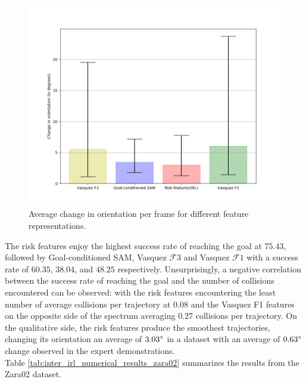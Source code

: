 \begin{figure}[htbp]
	\includegraphics[width=.95\linewidth]{plots/zara02_inter_irl_adjusted_speed/compute_trajectory_smoothness_zara02_adjusted_inter_irl.png}
	\caption{Average change in orientation per frame for different feature representations.}
	\label{fig:inter_irl-trajectory_smoothness-zara02}
\end{figure}

 The risk features enjoy the highest success rate of reaching the goal at $75.43$, followed by Goal-conditioned SAM, Vasquez $\mathcal{F}3$ and Vasquez $\mathcal{F}1$ with a success rate of $60.35$, $38.04$, and $48.25$ respectively. Unsurprisingly, a negative correlation between the success rate of reaching the goal and the number of collisions encountered can be observed: with the risk features encountering the least number of average collisions per trajectory at $0.08$ and the Vasquez F1 features on the opposite side of the spectrum averaging $0.27$ collisions per trajectory.  
On the qualitative side, the risk features produce the smoothest trajectories, changing its orientation an average of $3.03\degree$ in a dataset with an average of $0.63\degree$ change observed in the expert demonstrations. \\
Table \autoref{tab:inter_irl_numerical_results_zara02} summarizes the results from the Zara02 dataset.


